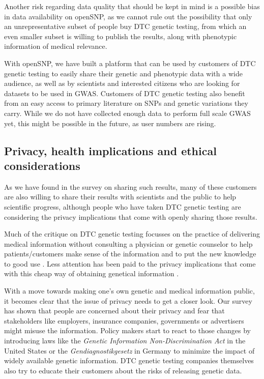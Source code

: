 \documentclass[10pt]{article}
\begin{document}
Another risk regarding data quality that should be kept in mind is a possible bias in data availability on openSNP, as we cannot 
rule out the possibility that only an unrepresentative subset of people buy DTC genetic testing, from which an even smaller subset 
is willing to publish the results, along with phenotypic information of medical relevance.

With openSNP, we have built a platform that can be used by customers of DTC genetic testing to easily share their genetic and phenotypic 
data with a wide audience, as well as by scientists and interested citizens who are looking for datasets to be used in GWAS. 
Customers of DTC genetic testing also benefit from an easy access to primary literature on SNPs and genetic variations they carry. 
While we do not have collected enough data to perform full scale GWAS yet, this might be possible in the future, as user numbers are rising. 

\subsection*{Privacy, health implications and ethical considerations}
As we have found in the survey on sharing such results, many of these customers are also willing to share their results with scientists and 
the public to help scientific progress, although people who have taken DTC genetic testing are considering the privacy implications that come 
with openly sharing those results.      

Much of the critique on DTC genetic testing focusses on the practice 
of delivering medical information without consulting a physician or genetic counselor to help patients/customers make sense of the information 
and to put the new knowledge to good use \cite{Hauskeller2011,Hogarth2008,Wasson2009}. Less attention has been paid to the privacy implications 
that come with this cheap way of obtaining genetical information \cite{Caulfield2011,Joh2011}. 

With a move towards making one's own genetic and medical information public, it becomes clear that the issue of privacy needs to get a closer look. 
Our survey has shown that people are concerned about their privacy and fear that stakeholders like employers, insurance companies, governments 
or advertisers might misuse the information. Policy makers start to react to those changes by introducing laws like the 
\textit{Genetic Information Non-Discrimination Act} in the United States or the \emph{Gendiagnostikgesetz} in Germany to minimize the impact of
widely available genetic information. DTC genetic testing companies themselves also try to educate their customers about the risks of releasing genetic data.  
\end{document}
